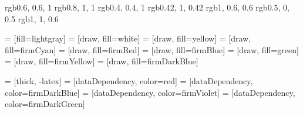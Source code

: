 \definecolor{firmBlue}     {rgb}{0.6,  0.6, 1   }
\definecolor{firmCyan}     {rgb}{0.8,  1,   1   }
\definecolor{firmDarkBlue} {rgb}{0.4,  0.4, 1   }
\definecolor{firmGreen}    {rgb}{0.42, 1,   0.42}
\definecolor{firmRed}      {rgb}{1,    0.6, 0.6 }
\definecolor{firmViolet}   {rgb}{0.5,  0,   0.5}
\definecolor{firmYellow}   {rgb}{1,    1,   0.6 }

      = [fill=lightgray]
       = [draw, fill=white]
      = [draw, fill=yellow]
      = [draw, fill=firmCyan]
    = [draw, fill=firmRed]
     = [draw, fill=firmBlue]
        = [draw, fill=green]
       = [draw, fill=firmYellow]
      = [draw, fill=firmDarkBlue]

    = [thick, -latex]
 = [dataDependency, color=red]
  = [dataDependency, color=firmDarkBlue]
              = [dataDependency, color=firmViolet]
        = [dataDependency, color=firmDarkGreen]

